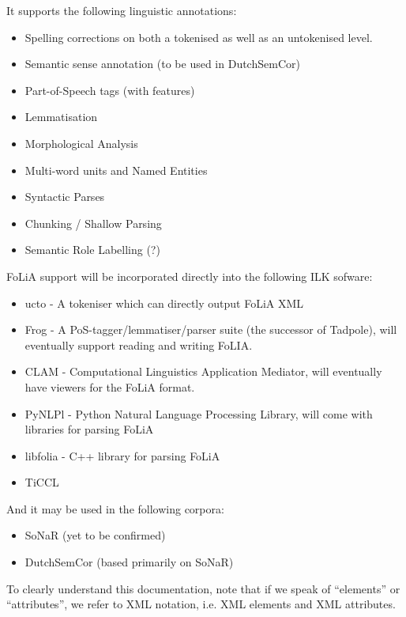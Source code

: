 \documentclass[a4paper,12pt]{report}
\begin{document}
It supports the following linguistic annotations:

\begin{itemize}
\item Spelling corrections on both a tokenised as well as an untokenised level.
\item Semantic sense annotation (to be used in DutchSemCor)
\item Part-of-Speech tags (with features)
\item Lemmatisation
\item Morphological Analysis
\item Multi-word units and Named Entities
\item Syntactic Parses
\item Chunking / Shallow Parsing
\item Semantic Role Labelling (?)
\end{itemize}

FoLiA support will be incorporated directly into the following ILK sofware:


\begin{itemize} 
\item ucto - A tokeniser which can directly output FoLiA XML 
\item Frog - A PoS-tagger/lemmatiser/parser suite (the successor of Tadpole), will eventually support reading and writing FoLIA.
\item CLAM - Computational Linguistics Application Mediator, will eventually have viewers for the FoLiA format.
\item PyNLPl - Python Natural Language Processing Library, will come with libraries for parsing FoLiA
\item libfolia - C++ library for parsing FoLiA
\item TiCCL
\end{itemize}

And it may be used in the following corpora:

\begin{itemize} 
\item SoNaR (yet to be confirmed)
\item DutchSemCor (based primarily on SoNaR)
\end{itemize}

To clearly understand this documentation, note that if we speak of ``elements'' or ``attributes'', we refer to XML notation, i.e. XML elements and XML attributes.
\end{document}
